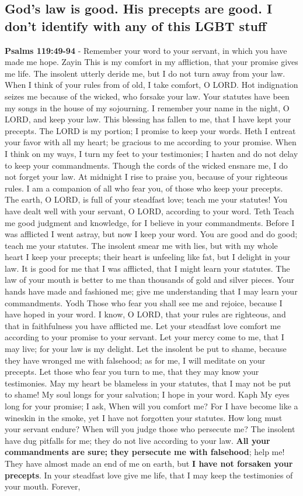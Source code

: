\documentclass[11pt]{article}
\begin{document}
\subsection{God's law is good. His precepts are good. I don't identify with any of this LGBT stuff}
\label{sec:orgcf9723b}
\textbf{Psalms 119:49-94} - Remember your word to your servant, in which you have made me hope. Zayin This is my comfort in my affliction, that your promise gives me life. The insolent utterly deride me, but I do not turn away from your law. When I think of your rules from of old, I take comfort, O LORD. Hot indignation seizes me because of the wicked, who forsake your law. Your statutes have been my songs in the house of my sojourning. I remember your name in the night, O LORD, and keep your law. This blessing has fallen to me, that I have kept your precepts. The LORD is my portion; I promise to keep your words. Heth I entreat your favor with all my heart; be gracious to me according to your promise. When I think on my ways, I turn my feet to your testimonies; I hasten and do not delay to keep your commandments. Though the cords of the wicked ensnare me, I do not forget your law. At midnight I rise to praise you, because of your righteous rules. I am a companion of all who fear you, of those who keep your precepts. The earth, O LORD, is full of your steadfast love; teach me your statutes! You have dealt well with your servant, O LORD, according to your word. Teth Teach me good judgment and knowledge, for I believe in your commandments. Before I was afflicted I went astray, but now I keep your word. You are good and do good; teach me your statutes. The insolent smear me with lies, but with my whole heart I keep your precepts; their heart is unfeeling like fat, but I delight in your law. It is good for me that I was afflicted, that I might learn your statutes. The law of your mouth is better to me than thousands of gold and silver pieces. Your hands have made and fashioned me; give me understanding that I may learn your commandments. Yodh Those who fear you shall see me and rejoice, because I have hoped in your word. I know, O LORD, that your rules are righteous, and that in faithfulness you have afflicted me. Let your steadfast love comfort me according to your promise to your servant. Let your mercy come to me, that I may live; for your law is my delight. Let the insolent be put to shame, because they have wronged me with falsehood; as for me, I will meditate on your precepts. Let those who fear you turn to me, that they may know your testimonies. May my heart be blameless in your statutes, that I may not be put to shame! My soul longs for your salvation; I hope in your word. Kaph My eyes long for your promise; I ask, When will you comfort me? For I have become like a wineskin in the smoke, yet I have not forgotten your statutes. How long must your servant endure? When will you judge those who persecute me? The insolent have dug pitfalls for me; they do not live according to your law. \textbf{All your commandments are sure; they persecute me with falsehood}; help me! They have almost made an end of me on earth, but \textbf{I have not forsaken your precepts}. In your steadfast love give me life, that I may keep the testimonies of your mouth. Forever, 
\end{document}
